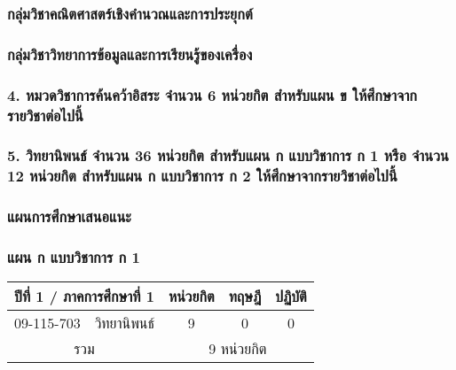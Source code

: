 \newpage
\subsubsection*{กลุ่มวิชาคณิตศาสตร์เชิงคำนวณและการประยุกต์}



\subsubsection*{กลุ่มวิชาวิทยาการข้อมูลและการเรียนรู้ของเครื่อง}



\subsubsection*{4. หมวดวิชาการค้นคว้าอิสระ จำนวน 6 หน่วยกิต สำหรับแผน ข ให้ศึกษาจากรายวิชาต่อไปนี้}



\subsubsection*{5. วิทยานิพนธ์ จำนวน 36 หน่วยกิต สำหรับแผน ก แบบวิชาการ ก 1 หรือ จำนวน 12 หน่วยกิต สำหรับแผน ก แบบวิชาการ ก 2 ให้ศึกษาจากรายวิชาต่อไปนี้}



\clearpage
\subsubsection{แผนการศึกษาเสนอแนะ}

\subsubsection*{แผน ก แบบวิชาการ ก 1}


\renewcommand{\arraystretch}{1.4}
\begin{tabular}{|cp{}|ccc|}
\hline
\multicolumn{2}{|c|}{ปีที่ 1 / ภาคการศึกษาที่ 1} & \multicolumn{1}{c|}{หน่วยกิต} & \multicolumn{1}{c|}{ทฤษฎี} & \multicolumn{1}{c|}{ปฏิบัติ}  \\ \hline
\multicolumn{1}{|c|}{09-115-703}  & วิทยานิพนธ์  & \multicolumn{1}{c|}{9}        & \multicolumn{1}{c|}{0}     & \multicolumn{1}{c|}{0}                    \\ \hline
\multicolumn{2}{|c|}{รวม}                        & \multicolumn{3}{c|}{9 หน่วยกิต}                                                                            \\ \hline
\end{tabular}

